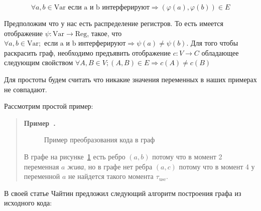 \documentclass[12pt]{article}
\newcounter{example}[section]
\newenvironment{example}[1][]{\refstepcounter{example}\par\medskip\noindent\begin{quote}
\textbf{Пример~\theexample. #1}\rmfamily}{\end{quote}\medskip}
\begin{document}
$$\forall a, b \in \text{Var} \text{ если a и b интерферируют}  \Rightarrow (\varphi(a), \varphi(b)) \in E$$

Предположим что у нас есть распределение регистров. То есть имеется отображение $\psi: \text{Var} \to \text{Reg}$,
такое, что $\forall a, b \in \text{Var}; \text{ если a и b интерферируют} \Rightarrow \psi(a) \neq \psi(b)$.
Для того чтобы раскрасить граф, необходимо предъявить отображение $c: V \to C$ обладающее следующим свойством
$\forall A, B \in V; (A, B) \in E \Rightarrow c(A) \neq c(B)$


Для простоты будем считать что никакие значения переменных в наших примерах не совпадают.

Рассмотрим простой пример:

\begin{example}
    \begin{figure}[H]
        \centering
    \caption{Пример преобразования кода в граф}
    \label{fig:ex1}
    \end{figure}

    В графе на рисунке~\ref{fig:ex1} есть ребро $(a, b)$ потому что в момент 2 переменная $a$ \textit{жива}, но в графе нет ребра $(a, c)$
    потому что в момент 4 у переменной $a$ не найдется такого момента $\tau_{\text{use}}$.
\end{example}


В своей статье Чайтин предложил следующий алгоритм построения графа из исходного кода:
\end{document}
